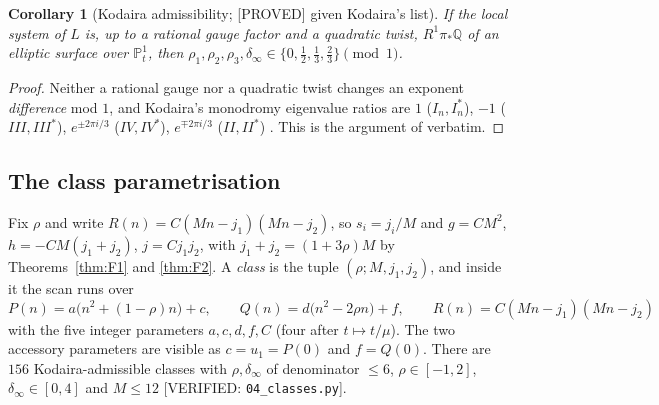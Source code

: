 \documentclass[11pt,reqno]{amsart}
\theoremstyle{plain}
\newtheorem{corollary}[theorem]{Corollary}
\theoremstyle{definition}
\theoremstyle{remark}
\theoremstyle{plain}
\newcommand{\Q}{\mathbb{Q}}
\newcommand{\PP}{\mathbb{P}}
\newcommand{\Proved}{\textup{\textsf{[PROVED]}}}
\newcommand{\Verified}[1]{\textup{\textsf{[VERIFIED: #1]}}}
\begin{document}
\begin{corollary}[Kodaira admissibility; \Proved{} given Kodaira's list]\label{cor:kodaira}
If the local system of $L$ is, up to a rational gauge factor and a quadratic
twist, $R^1\pi_*\Q$ of an elliptic surface over $\PP^1_t$, then
$\rho_1,\rho_2,\rho_3,\delta_\infty\in\{0,\tfrac12,\tfrac13,\tfrac23\}\pmod1$.
\end{corollary}

\begin{proof}
Neither a rational gauge nor a quadratic twist changes an exponent
\emph{difference} mod $1$, and Kodaira's monodromy eigenvalue ratios are $1$
($I_n,I_n^*$), $-1$ ($III,III^*$), $e^{\pm2\pi i/3}$ ($IV,IV^*$),
$e^{\mp2\pi i/3}$ ($II,II^*$) \cite{Kodaira1963,MirandaBook}. This is the
argument of \cite[Theorem~B(ii)]{CLASS} verbatim.
\end{proof}

\subsection{The class parametrisation}
Fix $\rho$ and write $R(n)=C(Mn-j_1)(Mn-j_2)$, so $s_i=j_i/M$ and
$g=CM^2$, $h=-CM(j_1+j_2)$, $j=Cj_1j_2$, with $j_1+j_2=(1+3\rho)M$ by
Theorems~\ref{thm:F1} and \ref{thm:F2}. A \emph{class} is the tuple
$(\rho;M,j_1,j_2)$, and inside it the scan runs over
\begin{equation}\label{eq:class}
P(n)=a\bigl(n^2+(1-\rho)n\bigr)+c,\qquad
Q(n)=d\bigl(n^2-2\rho n\bigr)+f,\qquad
R(n)=C(Mn-j_1)(Mn-j_2)
\end{equation}
with the five integer parameters $a,c,d,f,C$ (four after $t\mapsto t/\mu$). The
two accessory parameters are visible as $c=u_1=P(0)$ and $f=Q(0)$. There are
$156$ Kodaira-admissible classes with $\rho,\delta_\infty$ of denominator $\le6$,
$\rho\in[-1,2]$, $\delta_\infty\in[0,4]$ and $M\le12$
\Verified{\texttt{04\_classes.py}}.
\end{document}
